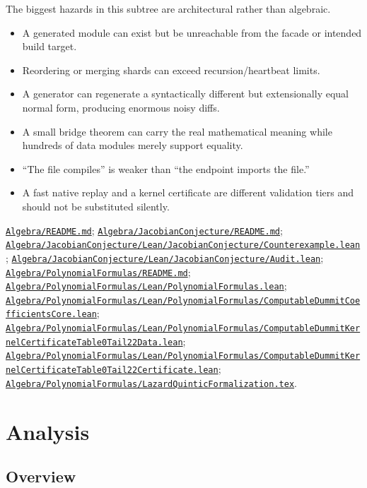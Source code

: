 \documentclass[
  10pt,
  a4paper,
  twoside,
  open=any,
  parskip=half,
  headings=big
]{scrreprt}
\newcommand{\CommitFull}{675d0a2ff0fc624fba199e006049016ba806f40a}
\newcommand{\RepoBlobBase}{https://github.com/VladimirReshetnikov/ProveIt/blob/\CommitFull/}
\newcommand{\RepoFile}[1]{%
  \href{\RepoBlobBase\detokenize{#1}}{\nolinkurl{#1}}}
\begin{document}
\begin{gotchabox}
The biggest hazards in this subtree are architectural rather than algebraic.

\begin{itemize}
  \item A generated module can exist but be unreachable from the facade or
        intended build target.
  \item Reordering or merging shards can exceed recursion/heartbeat limits.
  \item A generator can regenerate a syntactically different but extensionally
        equal normal form, producing enormous noisy diffs.
  \item A small bridge theorem can carry the real mathematical meaning while
        hundreds of data modules merely support equality.
  \item ``The file compiles'' is weaker than ``the endpoint imports the file.''
  \item A fast native replay and a kernel certificate are different validation
        tiers and should not be substituted silently.
\end{itemize}
\end{gotchabox}

\begin{sourcebox}
\RepoFile{Algebra/README.md};
\RepoFile{Algebra/JacobianConjecture/README.md};
\RepoFile{Algebra/JacobianConjecture/Lean/JacobianConjecture/Counterexample.lean};
\RepoFile{Algebra/JacobianConjecture/Lean/JacobianConjecture/Audit.lean};
\RepoFile{Algebra/PolynomialFormulas/README.md};
\RepoFile{Algebra/PolynomialFormulas/Lean/PolynomialFormulas.lean};
\RepoFile{Algebra/PolynomialFormulas/Lean/PolynomialFormulas/ComputableDummitCoefficientsCore.lean};
\RepoFile{Algebra/PolynomialFormulas/Lean/PolynomialFormulas/ComputableDummitKernelCertificateTable0Tail22Data.lean};
\RepoFile{Algebra/PolynomialFormulas/Lean/PolynomialFormulas/ComputableDummitKernelCertificateTable0Tail22Certificate.lean};
\RepoFile{Algebra/PolynomialFormulas/LazardQuinticFormalization.tex}.
\end{sourcebox}

\chapter{Analysis}
\label{chap:analysis}

\section{Overview}
\end{document}
